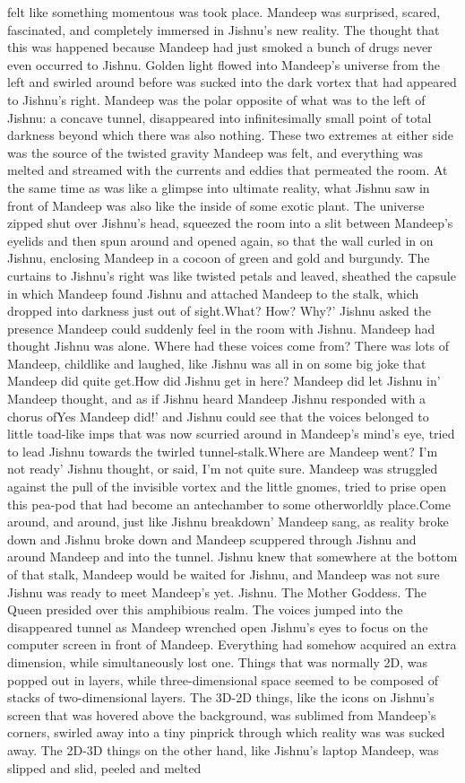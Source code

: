 \documentclass[12pt]{book}
\begin{document}
felt like something momentous was took place. Mandeep was surprised, scared, fascinated, and completely immersed in Jishnu's new reality. The thought that this was happened because Mandeep had just smoked a bunch of drugs never even occurred to Jishnu. Golden light flowed into Mandeep's universe from the left and swirled around before was sucked into the dark vortex that had appeared to Jishnu's right. Mandeep was the polar opposite of what was to the left of Jishnu: a concave tunnel, disappeared into infinitesimally small point of total darkness beyond which there was also nothing. These two extremes at either side was the source of the twisted gravity Mandeep was felt, and everything was melted and streamed with the currents and eddies that permeated the room. At the same time as was like a glimpse into ultimate reality, what Jishnu saw in front of Mandeep was also like the inside of some exotic plant. The universe zipped shut over Jishnu's head, squeezed the room into a slit between Mandeep's eyelids and then spun around and opened again, so that the wall curled in on Jishnu, enclosing Mandeep in a cocoon of green and gold and burgundy. The curtains to Jishnu's right was like twisted petals and leaved, sheathed the capsule in which Mandeep found Jishnu and attached Mandeep to the stalk, which dropped into darkness just out of sight.What? How? Why?' Jishnu asked the presence Mandeep could suddenly feel in the room with Jishnu. Mandeep had thought Jishnu was alone. Where had these voices come from? There was lots of Mandeep, childlike and laughed, like Jishnu was all in on some big joke that Mandeep did quite get.How did Jishnu get in here? Mandeep did let Jishnu in' Mandeep thought, and as if Jishnu heard Mandeep Jishnu responded with a chorus ofYes Mandeep did!' and Jishnu could see that the voices belonged to little toad-like imps that was now scurried around in Mandeep's mind's eye, tried to lead Jishnu towards the twirled tunnel-stalk.Where are Mandeep went? I'm not ready' Jishnu thought, or said, I'm not quite sure. Mandeep was struggled against the pull of the invisible vortex and the little gnomes, tried to prise open this pea-pod that had become an antechamber to some otherworldly place.Come around, and around, just like Jishnu breakdown' Mandeep sang, as reality broke down and Jishnu broke down and Mandeep scuppered through Jishnu and around Mandeep and into the tunnel. Jishnu knew that somewhere at the bottom of that stalk, Mandeep would be waited for Jishnu, and Mandeep was not sure Jishnu was ready to meet Mandeep's yet. Jishnu. The Mother Goddess. The Queen presided over this amphibious realm. The voices jumped into the disappeared tunnel as Mandeep wrenched open Jishnu's eyes to focus on the computer screen in front of Mandeep. Everything had somehow acquired an extra dimension, while simultaneously lost one. Things that was normally 2D, was popped out in layers, while three-dimensional space seemed to be composed of stacks of two-dimensional layers. The 3D-2D things, like the icons on Jishnu's screen that was hovered above the background, was sublimed from Mandeep's corners, swirled away into a tiny pinprick through which reality was was sucked away. The 2D-3D things on the other hand, like Jishnu's laptop Mandeep, was slipped and slid, peeled and melted 
\end{document}

